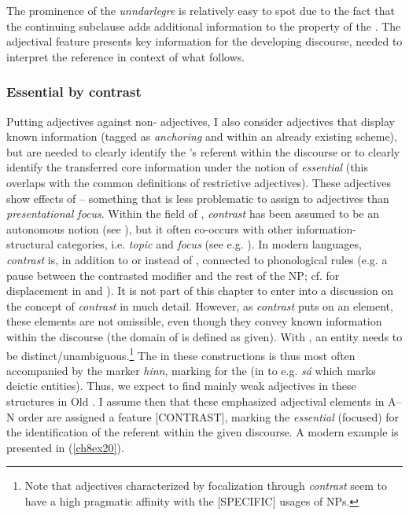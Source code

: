 \documentclass[output=paper,colorlinks,citecolor=brown]{langscibook}
\begin{document}
The prominence of the  \emph{unndarlegre} is relatively easy to
spot due to the fact that the continuing subclause adds additional
information to the property of the . The adjectival feature
presents key information for the developing discourse, needed to
interpret the reference in context of what follows.


\subsubsection{Essential by contrast}\label{ch8s3.4.3}
Putting  adjectives against non- adjectives, I
also consider adjectives that display known information (tagged as
\emph{anchoring} and within an already existing scheme), but are needed
to clearly identify the 's referent within the discourse or to
clearly identify the transferred core information under the notion of
\emph{essential} (this overlaps with the common definitions of
restrictive adjectives). These adjectives show effects of 
-- something that is less problematic to assign to adjectives than
\emph{presentational focus}. Within the field of ,
\emph{contrast} has been assumed to be an autonomous notion (see \citealp{Molnár2002}), but it often co-occurs with other information-structural
categories, i.e. \emph{topic} and \emph{focus} (see e.g. \citealp{Repp2010}). In
modern languages, \emph{contrast} is, in addition to or instead of  ,
connected to phonological rules (e.g. a pause between the contrasted
modifier and the rest of the NP; cf. \citealp[267f]{Rijkhoff2002} for 
displacement in  and ). It is not part of this chapter to
enter into a discussion on the concept of \emph{contrast} in much detail.
However, as \emph{contrast} puts  on an element, these elements
are not omissible, even though they convey known information within the
discourse (the domain of  is defined as given). With , an
entity needs to be distinct/unambiguous.\footnote{Note that 
  adjectives characterized by focalization through \emph{contrast} seem
  to have a high pragmatic affinity with the {[}SPECIFIC{]} usages of
  NPs.} The  in these constructions is thus most often
accompanied by the  marker \emph{hinn}, marking
 for the  (in  to e.g. \emph{sá} which
marks deictic entities). Thus, we expect to find mainly weak adjectives
in these structures in Old . I assume then that these
emphasized adjectival elements in A--N order are assigned a feature
{[}CONTRAST{]}, marking the  \emph{essential} (focused) for the
identification of the referent within the given discourse. A modern
example is presented in (\ref{ch8ex20}).
\end{document}
